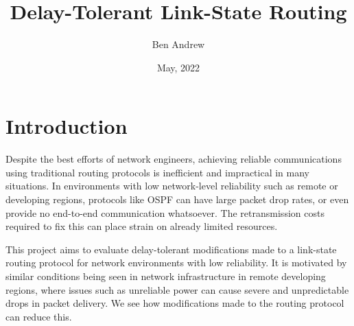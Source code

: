 \documentclass[withindex,glossary,openany]{cam-thesis}
\title{Delay-Tolerant Link-State Routing}
\author{Ben Andrew}
\date{May, 2022}
\begin{document}
\frontmatter{}



\listoffigures


\pagebreak

\chapter{Introduction}



Despite the best efforts of network engineers, achieving reliable communications using traditional routing protocols is inefficient and impractical in many situations. In environments with low network-level reliability such as remote or developing regions, protocols like OSPF can have large packet drop rates, or even provide no end-to-end communication whatsoever. The retransmission costs required to fix this can place strain on already limited resources.

This project aims to evaluate delay-tolerant modifications made to a link-state routing protocol for network environments with low reliability. It is motivated by similar conditions being seen in network infrastructure in remote developing regions, where issues such as unreliable power can cause severe and unpredictable drops in packet delivery. We see how modifications made to the routing protocol can reduce this.



\end{document}
